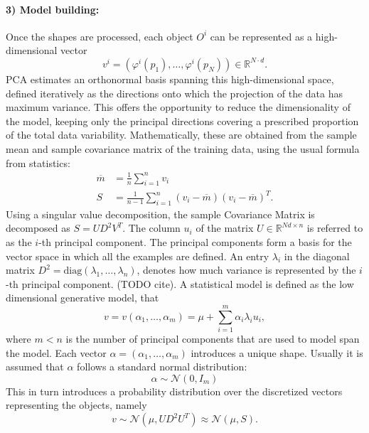 \documentclass{InsightArticle}
\def\R{\mathds{R}} %
\begin{document}
\paragraph{3) Model building:}
Once the shapes are processed, each object $O^i$ can be
represented as a high-dimensional vector 
\[
v^i = (\varphi^i(p_1), \ldots, \varphi^i(p_N)) \in \R^{N\cdot d}.  
\]
PCA estimates an orthonormal basis spanning this
high-dimensional space, defined iteratively as the directions onto
which the projection of the data has maximum variance. This offers the
opportunity to reduce the dimensionality of the model, keeping only
the principal directions covering a prescribed proportion of the total
data variability.  Mathematically, these are obtained from the sample mean and sample covariance matrix of the 
training data, using the usual formula from statistics:
\begin{equation}
 \begin{split}
   \overline{m} & = \frac{1}{n} \sum_{i=1}^n v_i \\
   S &= \frac{1}{n-1} \sum_{i=1}^n (v_i - \overline{m}) (v_i - \overline{m})^T.
   \end{split}
\end{equation}
Using a singular value decomposition, the sample Covariance Matrix is decomposed
as $S=UD^2V^T$. The column $u_i$ of the 
matrix $U \in \R^{Nd \times {n}}$ is referred to as the $i$-th principal component.
The principal components form a basis for the vector space in which all the examples are defined. 
An entry $\lambda_i$ in the diagonal matrix $D^2 = \text{diag}(\lambda_1, \ldots, \lambda_{n})$,  denotes how much variance is represented by the $i$-th principal component. (TODO cite).
A statistical model is defined as the low dimensional generative model, that
\[
v = v(\alpha_1, \ldots, \alpha_m) = \mu  + \sum_{i=1}^m \alpha_i \lambda_i u_i, 
\]
where $m < n$ is the number of principal components that are used to model span the model. 
Each vector $\alpha = (\alpha_1, \ldots, \alpha_m)$ introduces a unique shape. 
Usually it is assumed that $\alpha$ follows a standard normal distribution: 
\begin{equation} \label{eq:coeff-normal-assumption}
\alpha  \sim \mathcal{N}(0, I_m)
\end{equation}
This in turn introduces a probability distribution over the discretized vectors representing the objects, namely 
\begin{equation} \label{eq:prob-interpretation}
v \sim \mathcal{N}(\mu, UD^2U^T) \approx \mathcal{N}(\mu, S).
\end{equation}
\end{document}
